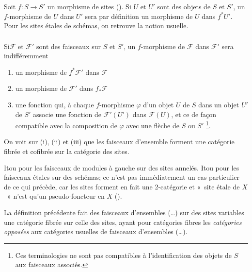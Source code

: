 \documentclass[10pt]{../fichiers-configuration-latex/smfart}
\begin{document}
\setcounter{subsection}{2}
\setcounter{subsubsection}{-1}
\subsubsection{}
Soit $f:S\rightarrow S'$ un morphisme de sites (). Si $U$ et
$U'$ sont des objets de $S$ et $S'$, un $f$-morphisme de $U$ dans $U'$
sera par définition un morphisme de $U$ dans $f^{\ast}U'$. Pour les
sites étales de schémas, on retrouve la notion usuelle.

\subsubsection{}
Si\pageoriginale $\mathcal{F}$ et $\mathcal{F}'$ sont des faisceaux
sur $S$ et $S'$, un $f$-morphisme de $\mathcal{F}$ dans
$\mathcal{F}'$ sera indifféremment
\begin{enumerate}
\renewcommand{\theenumi}{\roman{enumi}}
\renewcommand{\labelenumi}{(\theenumi)}
\item un morphisme de $f^{\ast}\mathcal{F}'$ dans $\mathcal{F}$

\item un morphisme de $\mathcal{F}'$ dans $f_{\ast}\mathcal{F}$

\item une fonction qui, à chaque $f$-morphisme $\varphi$ d'un objet
  $U$ de $S$ dans un objet $U'$ de $S'$ associe une fonction de
  $\mathcal{F}'(U')$ dans $\mathcal{F}(U)$, et ce de façon
  compatible avec la composition de $\varphi$ avec une flèche de $S$
  ou $S'$ \footnote{Ces terminologies ne sont pas compatibles à
  l'identification des objets de $S$ aux faisceaux associés.}.
\end{enumerate}

On voit sur (i), (ii) et (iii) que les faisceaux d'ensemble forment
une catégorie fibrée et cofibrée sur la catégorie des sites.

Itou pour les faisceaux de modules à gauche sur des sites
annelés. Itou pour les faisceaux étales sur des schémas; ce n'est pas
immédiatement un cas particulier de ce qui précède, car les sites
forment en fait une 2-catégorie et « site étale de $X$ »  n'est
qu'un pseudo-foncteur en $X$ ().

La définition précédente fait des faisceaux d'ensembles (\resp\ldots)
sur des sites variables une catégorie fibrée sur celle des sites, ayant
pour catégories fibres les \emph{catégories opposées} aux catégories
usuelles de faisceaux d'ensembles (\resp\ldots).
\end{document}

